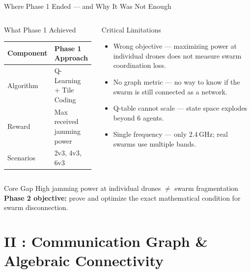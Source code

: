 \documentclass[10pt, aspectratio=169]{beamer}
\begin{document}
\begin{frame}{Where Phase 1 Ended --- and Why It Was Not Enough}
\begin{columns}[T,onlytextwidth]
\begin{block}{What Phase 1 Achieved}
  \small
  \renewcommand{\arraystretch}{1.3}
  \setlength{\tabcolsep}{4pt}
  \begin{tabular}{|l|l|}
  \hline
  \textbf{Component} & \textbf{Phase 1 Approach} \\
  \hline
  Algorithm & Q-Learning + Tile Coding \\ \hline
  Reward    & Max received jamming power \\ \hline
  Scenarios & 2v3, 4v3, 6v3 \\
  \hline
  \end{tabular}
\end{block}

\begin{alertblock}{Critical Limitations}
  \small
  \begin{itemize}
    \item \alert{Wrong objective} --- maximizing power at individual drones does not measure swarm coordination loss.
    \item \alert{No graph metric} --- no way to know if the swarm is still connected as a network.
    \item \alert{Q-table cannot scale} --- state space explodes beyond 6 agents.
    \item \alert{Single frequency} --- only 2.4\,GHz; real swarms use multiple bands.
  \end{itemize}
\end{alertblock}
\end{columns}

\vspace{0.3cm}
\begin{exampleblock}{Core Gap}
  \centering\small
  High jamming power at individual drones $\neq$ swarm fragmentation\\[4pt]
  \textbf{Phase 2 objective:} prove and optimize the \alert{exact mathematical condition} for swarm disconnection.
\end{exampleblock}
\end{frame}

\section{II : Communication Graph \& Algebraic Connectivity}\label{sec:graph}
\end{document}
